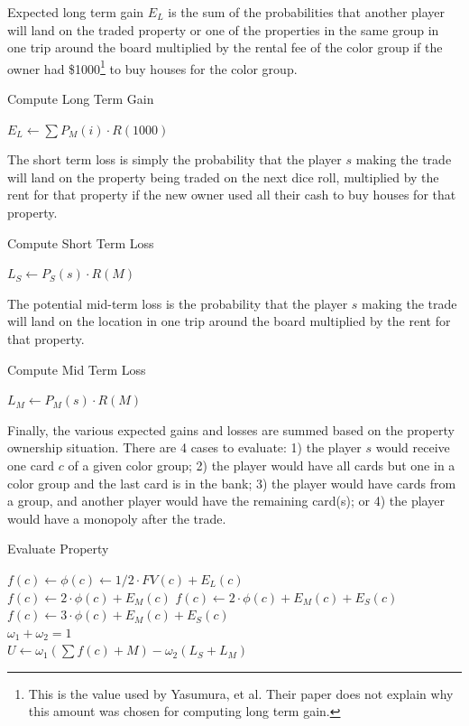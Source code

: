 Expected long term gain \(E_L\) is the sum of the probabilities that another
player will land on the traded property or one of the properties in the same
group in one trip around the board multiplied by the rental fee of the color
group if the owner had \$1000\footnote{This is the value used by Yasumura, et
al. Their paper does not explain why this amount was chosen for computing long
term gain.} to buy houses for the color group.
\begin{algorithm} 
\caption{Compute Long Term Gain}
\label{alg_ltg}
\begin{algorithmic}
   \STATE $E_L \gets \sum P_M(i) \cdot R(1000)$ 
\end{algorithmic}
\end{algorithm}

The short term loss is simply the probability that the player \(s\) making the
trade will land on the property being traded on the next dice roll, multiplied by the
rent for that property if the new owner used all their cash to buy houses for
that property.
\begin{algorithm} 
\caption{Compute Short Term Loss}
\label{alg_stl}
\begin{algorithmic}
   \STATE $L_S \gets P_S(s) \cdot R(M)$ 
\end{algorithmic}
\end{algorithm}

The potential mid-term loss is the probability that the player \(s\) making the
trade will land on the location in one trip around the board multiplied by the rent
for that property.
\begin{algorithm} 
\caption{Compute Mid Term Loss}
\label{alg_mtl}
\begin{algorithmic}
   \STATE $L_M \gets P_M(s) \cdot R(M)$ 
\end{algorithmic}
\end{algorithm}

Finally, the various expected gains and losses are summed based on the property
ownership situation. There are 4 cases to evaluate: 1) the player \(s\) would
receive one card \(c\) of a given color group; 2) the player would have all
cards but one in a color group and the last card is in the bank; 3) the player
would have cards from a group, and another player would have the remaining
card(s); or 4) the player would have a monopoly after the trade.
\begin{algorithm} 
\caption{Evaluate Property}
\label{alg_bigU}
\begin{algorithmic}
    \STATE $f(c) \gets \phi(c) \gets 1/2 \cdot FV(c) + E_L(c)$ \\
  \ENDIF
    \STATE $f(c) \gets 2 \cdot \phi(c) + E_M(c)$
  \ENDIF
    \STATE $f(c) \gets 2 \cdot \phi(c) + E_M(c) + E_S(c)$
  \ENDIF
    \STATE $f(c) \gets 3 \cdot \phi(c) + E_M(c) + E_S(c)$
  \ENDIF
\\
  \REQUIRE $\omega_1 + \omega_2 = 1$
\\
  $U \gets \omega_1(\sum f(c) + M) - \omega_2(L_S + L_M)$
\end{algorithmic}
\end{algorithm}


